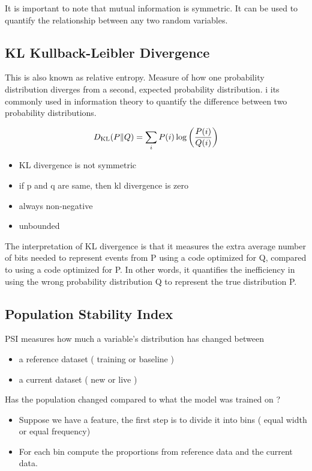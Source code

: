 \documentclass[10pt,a4paper]{article}
\begin{document}
	It is important to note that mutual information is symmetric. It can be used to quantify the relationship between any two random variables.

	\subsection{KL Kullback-Leibler Divergence}
	\label{kldivergence}
	This is also known as relative entropy. Measure of how one probability distribution diverges from a second, expected probability distribution. i its commonly used in information theory to quantify the difference between two probability distributions.

	\begin{align*}
		\large D_{\text{KL}}(P \| Q) = \sum_{i} P(i) \log\left(\frac{P(i)}{Q(i)}\right)
	\end{align*}

	\begin{itemize}
		\item KL divergence is not symmetric
		\item if p and q are same, then kl divergence is zero
		\item always non-negative
		\item unbounded
	\end{itemize}

	The interpretation of KL divergence is that it measures the extra average number of bits needed to represent events from P using a code optimized for Q, compared to using a code optimized for P. In other words, it quantifies the inefficiency in using the wrong probability distribution Q to represent the true distribution P.



	\subsection{Population Stability Index}

	PSI measures how much a variable’s distribution has changed between

	\begin{itemize}
		\item a reference dataset ( training  or baseline )
		\item a current dataset ( new or live )
	\end{itemize}

	Has the population changed compared to what the model was trained on ?

	\begin{itemize}
		\item Suppose we have a feature, the first step is to divide it into bins ( equal width or equal frequency)
		\item For each bin compute the proportions from reference data and the current data.
	\end{itemize}
\end{document}
